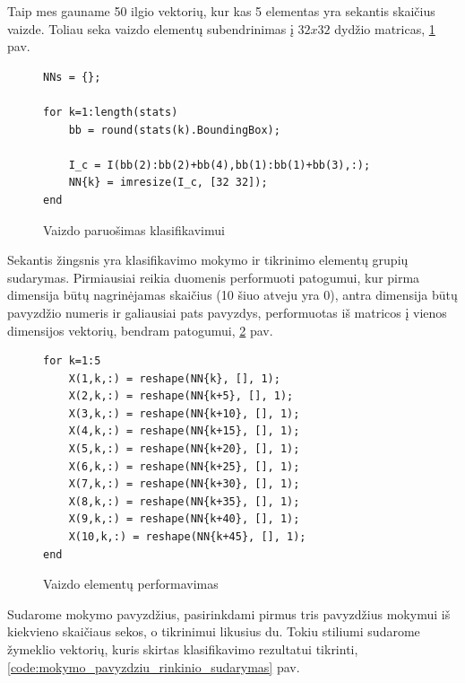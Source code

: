 \documentclass[11pt, a4paper, lithuanian]{article}
\begin{document}
    Taip mes gauname 50 ilgio vektorių, kur kas 5 elementas yra sekantis skaičius vaizde. Toliau seka vaizdo elementų subendrinimas į $32x32$ dydžio matricas, \ref{code:vaizdo_paruosimas_klasifikavimui} pav.

    \begin{figure}[h]
      \centering
      \caption{Vaizdo paruošimas klasifikavimui}
      \label{code:vaizdo_paruosimas_klasifikavimui}
      \begin{lstlisting}
NNs = {};

for k=1:length(stats)
    bb = round(stats(k).BoundingBox);
   
    I_c = I(bb(2):bb(2)+bb(4),bb(1):bb(1)+bb(3),:);
    NN{k} = imresize(I_c, [32 32]);
end
      \end{lstlisting}
    \end{figure}

    Sekantis žingsnis yra klasifikavimo mokymo ir tikrinimo elementų grupių sudarymas. Pirmiausiai reikia duomenis performuoti patogumui, kur pirma dimensija būtų nagrinėjamas skaičius (10 šiuo atveju yra 0), antra dimensija būtų pavyzdžio numeris ir galiausiai pats pavyzdys, performuotas iš matricos į vienos dimensijos vektorių, bendram patogumui, \ref{code:vaizdo_elementu_performavimas} pav.

    \begin{figure}[h]
      \centering
      \caption{Vaizdo elementų performavimas}
      \label{code:vaizdo_elementu_performavimas}
      \begin{lstlisting}
for k=1:5
    X(1,k,:) = reshape(NN{k}, [], 1);
    X(2,k,:) = reshape(NN{k+5}, [], 1);
    X(3,k,:) = reshape(NN{k+10}, [], 1);
    X(4,k,:) = reshape(NN{k+15}, [], 1);
    X(5,k,:) = reshape(NN{k+20}, [], 1);
    X(6,k,:) = reshape(NN{k+25}, [], 1);
    X(7,k,:) = reshape(NN{k+30}, [], 1);
    X(8,k,:) = reshape(NN{k+35}, [], 1);
    X(9,k,:) = reshape(NN{k+40}, [], 1);
    X(10,k,:) = reshape(NN{k+45}, [], 1);
end
      \end{lstlisting}
    \end{figure}

    Sudarome mokymo pavyzdžius, pasirinkdami pirmus tris pavyzdžius mokymui iš kiekvieno skaičiaus sekos, o tikrinimui likusius du. Tokiu stiliumi sudarome žymeklio vektorių, kuris skirtas klasifikavimo rezultatui tikrinti, \ref{code:mokymo_pavyzdziu_rinkinio_sudarymas} pav.
\end{document}
